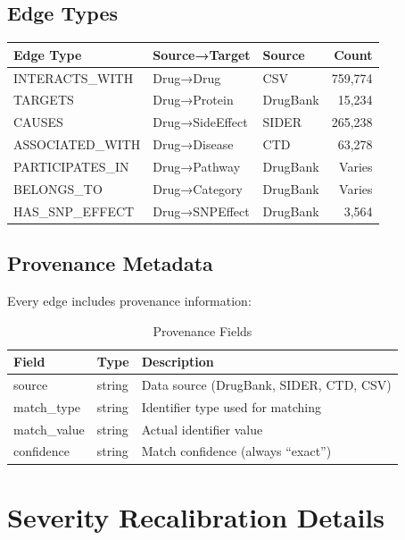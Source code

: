\documentclass[11pt,a4paper]{article}
\begin{document}
\subsection{Edge Types}

\begin{longtable}{@{}lllr@{}}
\toprule
\textbf{Edge Type} & \textbf{Source→Target} & \textbf{Source} & \textbf{Count} \\
\midrule
\endhead
INTERACTS\_WITH & Drug→Drug & CSV & 759,774 \\
TARGETS & Drug→Protein & DrugBank & 15,234 \\
CAUSES & Drug→SideEffect & SIDER & 265,238 \\
ASSOCIATED\_WITH & Drug→Disease & CTD & 63,278 \\
PARTICIPATES\_IN & Drug→Pathway & DrugBank & Varies \\
BELONGS\_TO & Drug→Category & DrugBank & Varies \\
HAS\_SNP\_EFFECT & Drug→SNPEffect & DrugBank & 3,564 \\
\bottomrule
\end{longtable}

\subsection{Provenance Metadata}

Every edge includes provenance information:

\begin{table}[h]
\centering
\caption{Provenance Fields}
\begin{tabular}{@{}lll@{}}
\toprule
\textbf{Field} & \textbf{Type} & \textbf{Description} \\
\midrule
source & string & Data source (DrugBank, SIDER, CTD, CSV) \\
match\_type & string & Identifier type used for matching \\
match\_value & string & Actual identifier value \\
confidence & string & Match confidence (always ``exact'') \\
\bottomrule
\end{tabular}
\end{table}

\newpage
\section{Severity Recalibration Details}
\end{document}
